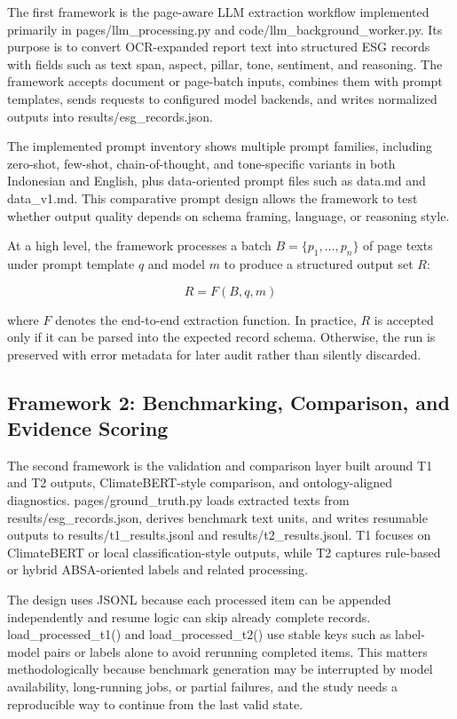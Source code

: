 The first framework is the page-aware LLM extraction workflow implemented primarily in pages/llm\_processing.py and code/llm\_background\_worker.py. Its purpose is to convert OCR-expanded report text into structured ESG records with fields such as text span, aspect, pillar, tone, sentiment, and reasoning. The framework accepts document or page-batch inputs, combines them with prompt templates, sends requests to configured model backends, and writes normalized outputs into results/esg\_records.json.

The implemented prompt inventory shows multiple prompt families, including zero-shot, few-shot, chain-of-thought, and tone-specific variants in both Indonesian and English, plus data-oriented prompt files such as data.md and data\_v1.md. This comparative prompt design allows the framework to test whether output quality depends on schema framing, language, or reasoning style.

At a high level, the framework processes a batch
\(B = \{p_1, \dots, p_n\}\) of page texts under prompt template \(q\)
and model \(m\) to produce a structured output set \(R\):

\[
R = F(B, q, m)
\]

where \(F\) denotes the end-to-end extraction function. In practice,
\(R\) is accepted only if it can be parsed into the expected record
schema. Otherwise, the run is preserved with error metadata for later
audit rather than silently discarded.

\subsection{Framework 2: Benchmarking, Comparison, and Evidence Scoring}

The second framework is the validation and comparison layer built around T1 and T2 outputs, ClimateBERT-style comparison, and ontology-aligned diagnostics. pages/ground\_truth.py loads extracted texts from results/esg\_records.json, derives benchmark text units, and writes resumable outputs to results/t1\_results.jsonl and results/t2\_results.jsonl. T1 focuses on ClimateBERT or local classification-style outputs, while T2 captures rule-based or hybrid ABSA-oriented labels and related processing.

The design uses JSONL because each processed item can be appended independently and resume logic can skip already complete records. load\_processed\_t1() and load\_processed\_t2() use stable keys such as label-model pairs or labels alone to avoid rerunning completed items. This matters methodologically because benchmark generation may be interrupted by model availability, long-running jobs, or partial failures, and the study needs a reproducible way to continue from the last valid state.


